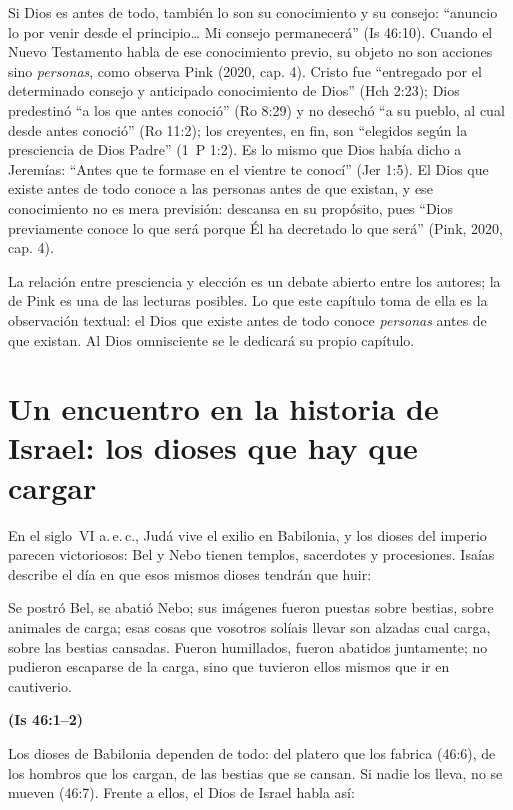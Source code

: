 \documentclass[11pt,letterpaper]{article}
\newcommand{\fuente}[1]{\par\hfill{\upshape\bfseries\small\textcolor{azul}{#1}}}
\begin{document}
Si Dios es antes de todo, también lo son su conocimiento y su consejo: ``anuncio lo por venir desde el principio\ldots{} Mi consejo permanecerá'' (Is 46:10). Cuando el Nuevo Testamento habla de ese conocimiento previo, su objeto no son acciones sino \emph{personas}, como observa Pink (2020, cap. 4). Cristo fue ``entregado por el determinado consejo y anticipado conocimiento de Dios'' (Hch 2:23); Dios predestinó ``a los que antes conoció'' (Ro 8:29) y no desechó ``a su pueblo, al cual desde antes conoció'' (Ro 11:2); los creyentes, en fin, son ``elegidos según la presciencia de Dios Padre'' (1~P 1:2). Es lo mismo que Dios había dicho a Jeremías: ``Antes que te formase en el vientre te conocí'' (Jer 1:5). El Dios que existe antes de todo conoce a las personas antes de que existan, y ese conocimiento no es mera previsión: descansa en su propósito, pues ``Dios previamente conoce lo que será porque Él ha decretado lo que será'' (Pink, 2020, cap. 4).

\begin{nota}[Precisión]
La relación entre presciencia y elección es un debate abierto entre los autores; la de Pink es una de las lecturas posibles. Lo que este capítulo toma de ella es la observación textual: el Dios que existe antes de todo conoce \emph{personas} antes de que existan. Al Dios omnisciente se le dedicará su propio capítulo.
\end{nota}

\section{Un encuentro en la historia de Israel: los dioses que hay que cargar}

En el siglo~VI a.\,e.\,c., Judá vive el exilio en Babilonia, y los dioses del imperio parecen victoriosos: Bel y Nebo tienen templos, sacerdotes y procesiones. Isaías describe el día en que esos mismos dioses tendrán que huir:

\begin{cita}Se postró Bel, se abatió Nebo; sus imágenes fueron puestas sobre bestias, sobre animales de carga; esas cosas que vosotros solíais llevar son alzadas cual carga, sobre las bestias cansadas. Fueron humillados, fueron abatidos juntamente; no pudieron escaparse de la carga, sino que tuvieron ellos mismos que ir en cautiverio.\fuente{(Is 46:1--2)}\end{cita}

Los dioses de Babilonia dependen de todo: del platero que los fabrica (46:6), de los hombros que los cargan, de las bestias que se cansan. Si nadie los lleva, no se mueven (46:7). Frente a ellos, el Dios de Israel habla así:
\end{document}
